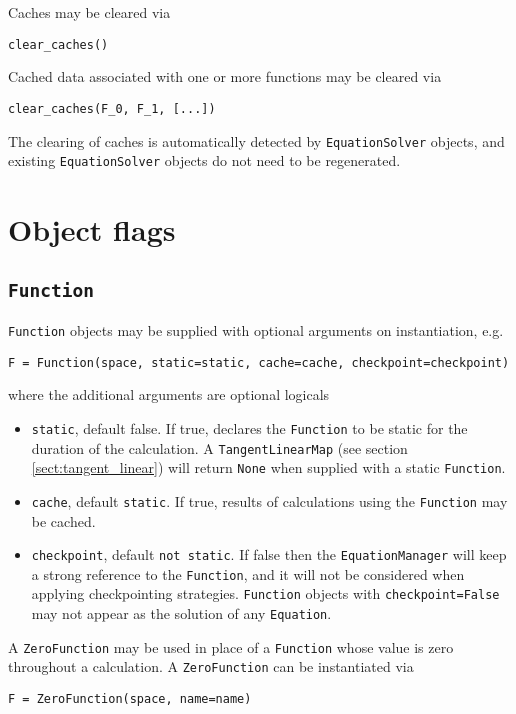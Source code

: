 \documentclass[11pt]{article}
\begin{document}
Caches may be cleared via
\begin{lstlisting}
clear_caches()
\end{lstlisting}
Cached data associated with one or more functions may be cleared via
\begin{lstlisting}
clear_caches(F_0, F_1, [...])
\end{lstlisting}

The clearing of caches is automatically detected by \texttt{EquationSolver}
objects, and existing \texttt{EquationSolver} objects do not need to be
regenerated.

\section{Object flags}\label{sect:flags}

\subsection{\texttt{Function}}\label{sect:Function_flags}

\texttt{Function} objects may be supplied with optional arguments on
instantiation, e.g.
\begin{lstlisting}
F = Function(space, static=static, cache=cache, checkpoint=checkpoint)
\end{lstlisting}
where the additional arguments are optional logicals
\begin{itemize}
  \item \texttt{static}, default false. If true, declares the \texttt{Function}
    to be static for the duration of the calculation. A
    \texttt{TangentLinearMap} (see section \ref{sect:tangent_linear}) will
    return \texttt{None} when supplied with a static \texttt{Function}.
  \item \texttt{cache}, default \texttt{static}. If true, results of
    calculations using the \texttt{Function} may be cached.
  \item \texttt{checkpoint}, default \texttt{not static}. If false then the
    \texttt{EquationManager} will keep a strong reference to the
    \texttt{Function}, and it will not be considered when applying
    checkpointing strategies. \texttt{Function} objects with
    \texttt{checkpoint=False} may not appear as the solution of any
    \texttt{Equation}.
\end{itemize}

A \texttt{ZeroFunction} may be used in place of a \texttt{Function} whose value
is zero throughout a calculation. A \texttt{ZeroFunction} can be instantiated
via
\begin{lstlisting}
F = ZeroFunction(space, name=name)
\end{lstlisting}
\end{document}
